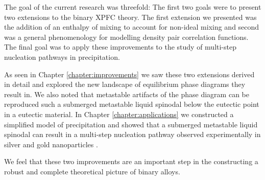 \label{chapter:conclusion}


The goal of the current research was threefold: The first two goals were to
present two extensions to the binary XPFC theory. The first extension we
presented was the addition of an enthalpy of mixing to account for non-ideal
mixing and second was a general phenomenology for modelling density pair
correlation functions. The final goal was to apply these improvements to the
study of multi-step nucleation pathways in precipitation. 


As seen in Chapter \ref{chapter:improvements} we saw these two extensions
derived in detail and explored the new landscape of equilibrium phase diagrams
they result in. We also noted that metastable artifacts of the phase diagram
can be reproduced such a submerged metastable liquid spinodal below the
eutectic point in a eutectic material. In Chapter \ref{chapter:applications} we
constructed a simplified model of precipitation and showed that a submerged
metastable liquid spinodal can result in a multi-step nucleation pathway
observed experimentally in silver and gold nanoparticles \cite{LOH17}. 


We feel that these two improvements are an important step in the constructing
a robust and complete theoretical picture of binary alloys.

